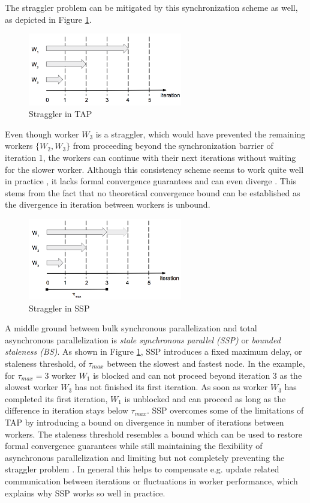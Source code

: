 The straggler problem can be mitigated by this synchronization scheme as well, as depicted in Figure \ref{fig:tap_straggler}.
\begin{figure}[ht]
\centering
\includegraphics[width=0.6\textwidth]{img/tap_straggler.png}
\caption{Straggler in TAP}
\label{fig:tap_straggler}
\end{figure}
Even though worker $W_3$ is a straggler, which would have prevented the remaining workers $\{W_2, W_3\}$ from proceeding beyond the synchronization barrier of iteration 1, the workers can continue with their next iterations without waiting for the slower worker.
Although this consistency scheme seems to work quite well in practice \cite{Li2014}, it lacks formal convergence guarantees and can even diverge \cite{dai2014high}.
This stems from the fact that no theoretical convergence bound can be established as the divergence in iteration between workers is unbound.
\begin{figure}[ht]
\centering
\includegraphics[width=0.6\textwidth]{img/ssp_straggler.png}
\caption{Straggler in SSP}
\label{fig:ssp_straggler}
\end{figure}
A middle ground between bulk synchronous parallelization and total asynchronous parallelization is \textit{stale synchronous parallel (SSP)} \cite{ho2013more} or \textit{bounded staleness (BS)}.
As shown in Figure \ref{fig:tap_straggler}, SSP introduces a fixed maximum delay, or staleness threshold, of $\tau_{max}$ between the slowest and fastest node.
In the example, for $\tau_{max} = 3$ worker $W_1$ is blocked and can not proceed beyond iteration 3 as the slowest worker $W_3$ has not finished its first iteration.
As soon as worker $W_3$ has completed its first iteration, $W_1$ is unblocked and can proceed as long as the difference in iteration stays below $\tau_{max}$.
SSP overcomes some of the limitations of TAP by introducing a bound on divergence in number of iterations between workers.
The staleness threshold resembles a bound which can be used to restore formal convergence guarantees while still maintaining the flexibility of asynchronous parallelization and limiting but not completely preventing the straggler problem \cite{cipar2013solving}.
In general this helps to compensate e.g. update related communication between iterations or fluctuations in worker performance, which explains why SSP works so well in practice.
